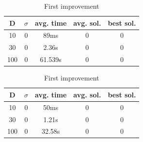 \documentclass{article}
\begin{document}
\begin{table}[htbp]
\begin{minipage}{.4\linewidth}
    \centering

    \begin{tabular}{|c|c|c|c|c|}
    \hline
    D   & $\sigma$  & avg. time     & avg. sol.     & best sol. \\
    \hline
    10  & 0         & 89ms          & 0       & 0 \\
    \hline
    30  & 0         & 2.36s         & 0       & 0 \\
    \hline
    100 & 0         & 61.539s       & 0       & 0 \\
    \hline
    \end{tabular}
    \caption{Best improvement}
  \end{minipage}%
  \quad %
  \begin{minipage}{.75\linewidth}
    \centering

    \begin{tabular}{|c|c|c|c|c|}
    \hline
    D   & $\sigma$  & avg. time     & avg. sol.     & best sol. \\
    \hline
    10  & 0         & 50ms          & 0             & 0 \\
    \hline
    30  & 0         & 1.21s         & 0             & 0 \\
    \hline
    100 & 0         & 32.58s        & 0             & 0 \\
    \hline
    \end{tabular}
    \caption{First improvement}
  \end{minipage}
\end{table}
\end{document}

